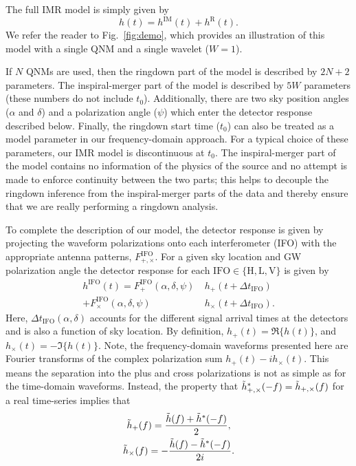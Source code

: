 The full IMR model is simply given by
\begin{equation}
	h(t) = h^\mathrm{IM}(t) + h^\mathrm{R}(t).
\end{equation}
We refer the reader to Fig.~\ref{fig:demo}, which provides an illustration of this model with a single QNM and a single wavelet ($W=1$).

If $N$ QNMs are used, then the ringdown part of the model is described by $2N+2$ parameters.
The inspiral-merger part of the model is described by $5W$ parameters (these numbers do not include $t_0$).
Additionally, there are two sky position angles ($\alpha$ and $\delta$) and a polarization angle ($\psi$) which enter the detector response described below.
Finally, the ringdown start time ($t_0$) can also be treated as a model parameter in our frequency-domain approach.
For a typical choice of these parameters, our IMR model is discontinuous at $t_0$.
The inspiral-merger part of the model contains no information of the physics of the source and no attempt is made to enforce continuity between the two parts; this helps to decouple the ringdown inference from the inspiral-merger parts of the data and thereby ensure that we are really performing a ringdown analysis. 

To complete the description of our model, the detector response is given by projecting the waveform polarizations onto each interferometer (IFO) with the appropriate antenna patterns, $F^\mathrm{IFO}_{+,\times}$.
For a given sky location and GW polarization angle the detector response for each ${\mathrm{IFO}\in \{\mathrm{H}, \mathrm{L}, \mathrm{V} \}}$ is given by
\begin{align} \label{eq:projection_antenna}
	h^\mathrm{IFO}(t) = F^\mathrm{IFO}_+(\alpha, \delta, \psi) ~ &h_+(t + \Delta t_\mathrm{IFO}) \nonumber \\
	+ F^\mathrm{IFO}_\times(\alpha, \delta, \psi) ~ &h_\times(t + \Delta t_\mathrm{IFO}).
\end{align}
Here, $\Delta t_\mathrm{IFO}(\alpha, \delta)$ accounts for the different signal arrival times at the detectors and is also a function of sky location.
By definition, $h_+(t) = \Re\{ h(t) \}$, and $h_\times(t) = -\Im \{ h(t) \}$.
Note, the frequency-domain waveforms presented here are Fourier transforms of the complex polarization sum $h_+(t) - ih_\times (t)$. This means the separation into the plus and cross polarizations is not as simple as for the time-domain waveforms. Instead, the property that $\Tilde{h}^*_{+,\times}(-f) = \Tilde{h}_{+,\times}(f)$ for a real time-series implies that
\begin{gather}
	\Tilde{h}_+(f) = \frac{\Tilde{h}(f) + \Tilde{h}^*(-f)}{2}, \\ 
	\Tilde{h}_\times(f) = -\frac{\Tilde{h}(f) - \Tilde{h}^*(-f)}{2i}.
\end{gather}



